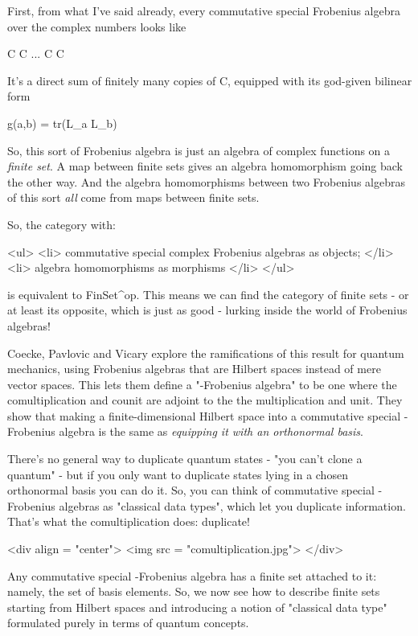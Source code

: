 First, from what I've said already, every commutative special
Frobenius algebra over the complex numbers looks like

C \oplus  C \oplus  ... C \oplus  C

It's a direct sum of finitely many copies of C, equipped with its
god-given bilinear form

g(a,b) = tr(L_{a} L_{b})

So, this sort of Frobenius algebra is just an algebra of complex
functions on a \emph{finite set}.   A map between finite sets gives an
algebra homomorphism going back the other way.  And the algebra 
homomorphisms between two Frobenius algebras of this sort \emph{all}
come from maps between finite sets.

So, the category with:

<ul>
<li>
 commutative special complex Frobenius algebras as objects;
</li>
<li>
 algebra homomorphisms as morphisms
</li>
</ul>

is equivalent to FinSet^{op}.  This means we can find the category
of finite sets - or at least its opposite, which is just as good -
lurking inside the world of Frobenius algebras!  

Coecke, Pavlovic and Vicary explore the ramifications of this result
for quantum mechanics, using Frobenius algebras that are Hilbert
spaces instead of mere vector spaces.  This lets them define 
a "\dagger -Frobenius algebra" to be one where the
comultiplication and counit are adjoint to the the multiplication
and unit.  They show that making a finite-dimensional Hilbert space
into a commutative special \dagger -Frobenius algebra is the same
as \emph{equipping it with an orthonormal basis}.


There's no general
way to duplicate quantum states - "you can't clone a
quantum" - but if you only want to duplicate states lying in a
chosen orthonormal basis you can do it.  So, you can think of
commutative special \dagger -Frobenius algebras as "classical data
types", which let you duplicate information.  That's what
the comultiplication does: duplicate!

<div align = "center">
<img src = "comultiplication.jpg">
</div>

Any commutative special \dagger -Frobenius algebra has a finite
set attached to it: namely, the set of basis elements.
So, we now see how to describe finite sets starting from
Hilbert spaces and introducing a notion of "classical data
type" formulated purely in terms of quantum concepts. 

